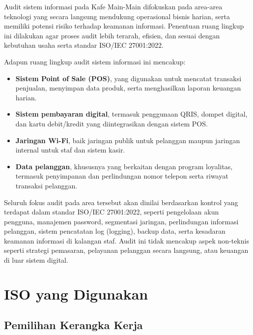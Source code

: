 \documentclass[12pt, a4paper]{report}
\begin{document}
Audit sistem informasi pada Kafe Main-Main difokuskan pada area-area teknologi yang secara langsung mendukung operasional bisnis harian, serta memiliki potensi risiko terhadap keamanan informasi. Penentuan ruang lingkup ini dilakukan agar proses audit lebih terarah, efisien, dan sesuai dengan kebutuhan usaha serta standar ISO/IEC 27001:2022.

Adapun ruang lingkup audit sistem informasi ini mencakup:

\begin{itemize}
    \item \textbf{Sistem Point of Sale (POS)}, yang digunakan untuk mencatat transaksi penjualan, menyimpan data produk, serta menghasilkan laporan keuangan harian.

    \item \textbf{Sistem pembayaran digital}, termasuk penggunaan QRIS, dompet digital, dan kartu debit/kredit yang diintegrasikan dengan sistem POS.

    \item \textbf{Jaringan Wi-Fi}, baik jaringan publik untuk pelanggan maupun jaringan internal untuk staf dan sistem kasir.

    \item \textbf{Data pelanggan}, khususnya yang berkaitan dengan program loyalitas, termasuk penyimpanan dan perlindungan nomor telepon serta riwayat transaksi pelanggan.
\end{itemize}

Seluruh fokus audit pada area tersebut akan dinilai berdasarkan kontrol yang terdapat dalam standar ISO/IEC 27001:2022, seperti pengelolaan akun pengguna, manajemen password, segmentasi jaringan, perlindungan informasi pelanggan, sistem pencatatan log (logging), backup data, serta kesadaran keamanan informasi di kalangan staf. Audit ini tidak mencakup aspek non-teknis seperti strategi pemasaran, pelayanan pelanggan secara langsung, atau keuangan di luar sistem digital.


\chapter{ISO yang Digunakan}
\label{bab:domain}

\section{Pemilihan Kerangka Kerja}
\end{document}
